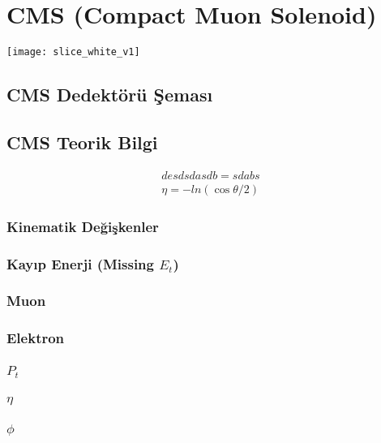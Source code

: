 \section{CMS (Compact Muon Solenoid)}
\texttt{[image: slice\_white\_v1]}
\subsection{CMS Dedektörü Şeması}
\newpage

\subsection{CMS Teorik Bilgi}



\begin{align}
desdsdasdb=sdab s \\
\eta = -ln(\cos \theta /2)
\end{align}







\newpage
\subsubsection{Kinematik Değişkenler}
\subsubsection*{Kayıp Enerji (Missing $E_t$)}
\subsubsection*{Muon}
\subsubsection*{Elektron}
\subsubsection*{$P_t$}
\subsubsection*{$\eta$}
\subsubsection*{$\phi$}
